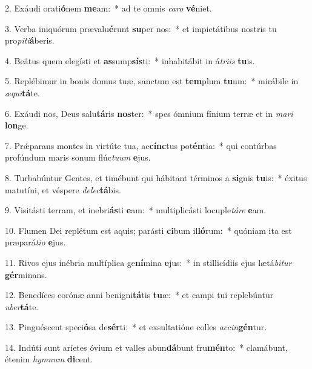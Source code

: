 2. Exáudi orati\textbf{ó}nem \textbf{me}am:~*  ad te omnis \textit{ca}\textit{ro} \textbf{vé}niet.\

3. Verba iniquórum prævalu\textbf{é}runt \textbf{su}per nos:~*  et impietátibus nostris tu pro\textit{pi}\textit{ti}\textbf{á}beris.\

4. Beátus quem elegísti et \textbf{as}sump\textbf{sís}ti:~*  inhabitábit in á\textit{tri}\textit{is} \textbf{tu}is.\

5. Replébimur in bonis domus tuæ, sanctum est \textbf{tem}plum \textbf{tu}um:~*  mirábile in \textit{æ}\textit{qui}\textbf{tá}te.\

6. Exáudi nos, Deus salu\textbf{tá}ris \textbf{nos}ter:~*  spes ómnium fínium terræ et in \textit{ma}\textit{ri} \textbf{lon}ge.\

7. Prǽparans montes in virtúte tua, ac\textbf{cínc}tus pot\textbf{én}tia:~*  qui contúrbas profúndum maris sonum flúc\textit{tu}\textit{um} \textbf{e}jus.\

8. Turbabúntur Gentes, et timébunt qui hábitant términos a \textbf{si}gnis \textbf{tu}is:~*  éxitus matutíni, et véspere \textit{de}\textit{lec}\textbf{tá}bis.\

9. Visitásti terram, et inebri\textbf{ás}ti \textbf{e}am:~*  multiplicásti locuple\textit{tá}\textit{re} \textbf{e}am.\

10. Flumen Dei replétum est aquis; parásti \textbf{ci}bum il\textbf{ló}rum:~*  quóniam ita est præpará\textit{ti}\textit{o} \textbf{e}jus.\

11. Rivos ejus inébria multíplica ge\textbf{ní}mina \textbf{e}jus:~*  in stillicídiis ejus lætá\textit{bi}\textit{tur} \textbf{gér}minans.\

12. Benedíces corónæ anni benigni\textbf{tá}tis \textbf{tu}æ:~*  et campi tui replebúntur \textit{u}\textit{ber}\textbf{tá}te.\

13. Pinguéscent speci\textbf{ó}sa de\textbf{sér}ti:~*  et exsultatióne colles \textit{ac}\textit{cin}\textbf{gén}tur.\

14. Indúti sunt aríetes óvium et valles abun\textbf{dá}bunt fru\textbf{mén}to:~*  clamábunt, étenim \textit{hym}\textit{num} \textbf{di}cent.\

